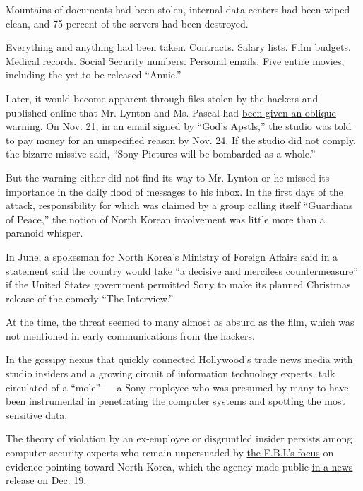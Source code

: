 Mountains of documents had been stolen, internal data centers had been
wiped clean, and 75 percent of the servers had been destroyed.

Everything and anything had been taken. Contracts. Salary lists. Film
budgets. Medical records. Social Security numbers. Personal emails. Five
entire movies, including the yet-to-be-released ``Annie.''

Later, it would become apparent through files stolen by the hackers and
published online that Mr. Lynton and Ms. Pascal had
\href{http://www.wired.com/2014/12/sony-hack-part-deux/}{been given an
oblique warning}. On Nov. 21, in an email signed by ``God's Apstls,''
the studio was told to pay money for an unspecified reason by Nov. 24.
If the studio did not comply, the bizarre missive said, ``Sony Pictures
will be bombarded as a whole.''

But the warning either did not find its way to Mr. Lynton or he missed
its importance in the daily flood of messages to his inbox. In the first
days of the attack, responsibility for which was claimed by a group
calling itself ``Guardians of Peace,'' the notion of North Korean
involvement was little more than a paranoid whisper.

In June, a spokesman for North Korea's Ministry of Foreign Affairs said
in a statement said the country would take ``a decisive and merciless
countermeasure'' if the United States government permitted Sony to make
its planned Christmas release of the comedy ``The Interview.''

At the time, the threat seemed to many almost as absurd as the film,
which was not mentioned in early communications from the hackers.

In the gossipy nexus that quickly connected Hollywood's trade news media
with studio insiders and a growing circuit of information technology
experts, talk circulated of a ``mole'' --- a Sony employee who was
presumed by many to have been instrumental in penetrating the computer
systems and spotting the most sensitive data.

The theory of violation by an ex-employee or disgruntled insider
persists among computer security experts who remain unpersuaded by
\href{http://www.politico.com/story/2014/12/fbi-briefed-on-alternate-sony-hack-theory-113866.html}{the
F.B.I.'s focus} on evidence pointing toward North Korea, which the
agency made public
\href{http://www.nytimes3xbfgragh.onion/aponline/2014/12/19/arts/ap-us-sony-hack.html}{in
a news release} on Dec. 19.

